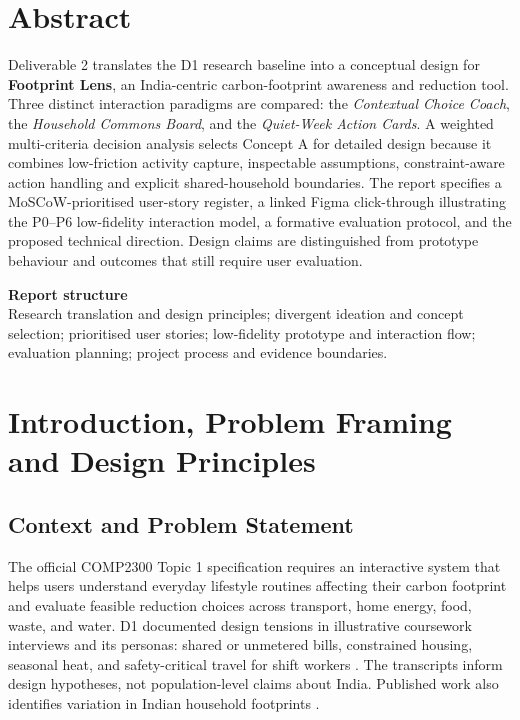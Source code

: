 \documentclass[12pt,a4paper]{article}
\begin{document}
\section*{Abstract}
Deliverable 2 translates the D1 research baseline into a conceptual design for \textbf{Footprint Lens}, an India-centric carbon-footprint awareness and reduction tool. Three distinct interaction paradigms are compared: the \emph{Contextual Choice Coach}, the \emph{Household Commons Board}, and the \emph{Quiet-Week Action Cards}. A weighted multi-criteria decision analysis selects Concept A for detailed design because it combines low-friction activity capture, inspectable assumptions, constraint-aware action handling and explicit shared-household boundaries. The report specifies a MoSCoW-prioritised user-story register, a linked Figma click-through illustrating the P0--P6 low-fidelity interaction model, a formative evaluation protocol, and the proposed technical direction. Design claims are distinguished from prototype behaviour and outcomes that still require user evaluation.

\vspace{0.4cm}
\begin{keybox}
\textbf{\sffamily\color{Navy}Report structure}\\
Research translation and design principles; divergent ideation and concept selection; prioritised user stories; low-fidelity prototype and interaction flow; evaluation planning; project process and evidence boundaries.
\end{keybox}

\clearpage
\tableofcontents
\clearpage
{}
\setcounter{page}{1}

\section{Introduction, Problem Framing and Design Principles}

\subsection{Context and Problem Statement}
The official COMP2300 Topic 1 specification requires an interactive system that helps users understand everyday lifestyle routines affecting their carbon footprint and evaluate feasible reduction choices across transport, home energy, food, waste, and water. D1 documented design tensions in illustrative coursework interviews and its personas: shared or unmetered bills, constrained housing, seasonal heat, and safety-critical travel for shift workers \cite{d1report}. The transcripts inform design hypotheses, not population-level claims about India. Published work also identifies variation in Indian household footprints \cite{lee2021}. 
\end{document}
